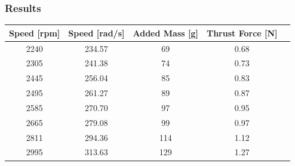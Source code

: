 \subsubsection{Results}
\begin{table}[H]
	\centering
	\begin{tabular}{|c|c|c|c|p{4.3cm}|}
		\hline%
		\textbf{Speed [rpm]}    & \textbf{Speed [rad/s]} & \textbf{Added Mass [g]}  & \textbf{Thrust Force [N]} \\ 
		\hline%
		2240                        	   &  234.57                           & 69                       & 0.68         \\
		\hline%
		2305 						       &  241.38				           & 74                       & 0.73         \\
		\hline%
		2445                               &  256.04   			               & 85                       & 0.83         \\
		\hline%
		2495                               &  261.27			               & 89                       & 0.87         \\
		\hline%
		2585                               &  270.70                          & 97                       & 0.95         \\
		\hline%
		2665 						       &  279.08			           & 99                       & 0.97         \\
		\hline%
		2811                               &  294.36   			           & 114                      & 1.12         \\
		\hline%
		2995                               &  313.63                          & 129                      & 1.27         \\

\end{tabular}
\end{table}
